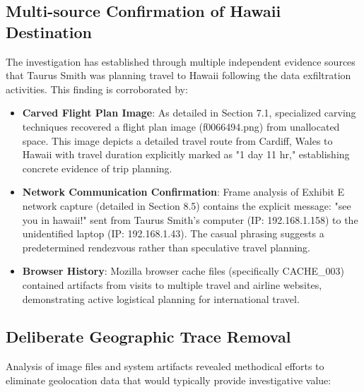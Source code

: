 \subsection{Multi-source Confirmation of Hawaii Destination}
The investigation has established through multiple independent evidence sources that Taurus Smith was planning travel to Hawaii following the data exfiltration activities. This finding is corroborated by:

\begin{itemize}
    \item \textbf{Carved Flight Plan Image}: As detailed in Section 7.1, specialized carving techniques recovered a flight plan image (f0066494.png) from unallocated space. This image depicts a detailed travel route from Cardiff, Wales to Hawaii with travel duration explicitly marked as "1 day 11 hr," establishing concrete evidence of trip planning.
    
    \item \textbf{Network Communication Confirmation}: Frame analysis of Exhibit E network capture (detailed in Section 8.5) contains the explicit message: "see you in hawaii!" sent from Taurus Smith's computer (IP: 192.168.1.158) to the unidentified laptop (IP: 192.168.1.43). The casual phrasing suggests a predetermined rendezvous rather than speculative travel planning.
    
    \item \textbf{Browser History}: Mozilla browser cache files (specifically CACHE\_003) contained artifacts from visits to multiple travel and airline websites, demonstrating active logistical planning for international travel.
\end{itemize}

\subsection{Deliberate Geographic Trace Removal}
Analysis of image files and system artifacts revealed methodical efforts to eliminate geolocation data that would typically provide investigative value:

